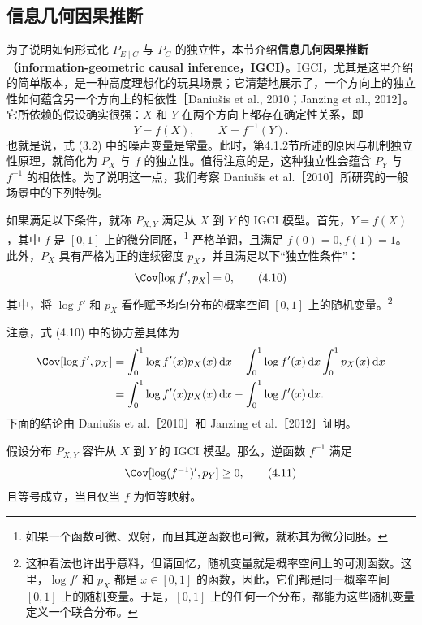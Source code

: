 \subsection{信息几何因果推断}

为了说明如何形式化 $P_{E\mid C}$ 与 $P_C$ 的独立性，本节介绍\textbf{信息几何因果推断（information-geometric causal inference，IGCI）}。IGCI，尤其是这里介绍的简单版本，是一种高度理想化的玩具场景；它清楚地展示了，一个方向上的独立性如何蕴含另一个方向上的相依性［Daniušis et al., 2010；Janzing et al., 2012］。它所依赖的假设确实很强：$X$ 和 $Y$ 在两个方向上都存在确定性关系，即
\[
 Y=f(X),\qquad X=f^{-1}(Y).
\]
也就是说，式 (3.2) 中的噪声变量是常量。此时，第4.1.2节所述的原因与机制独立性原理，就简化为 $P_X$ 与 $f$ 的独立性。值得注意的是，这种独立性会蕴含 $P_Y$ 与 $f^{-1}$ 的相依性。为了说明这一点，我们考察 Daniušis et al.［2010］所研究的一般场景中的下列特例。

\begin{definition}[信息几何因果推断模型]
如果满足以下条件，就称 $P_{X,Y}$ 满足从 $X$ 到 $Y$ 的 IGCI 模型。首先，$Y=f(X)$，其中 $f$ 是 $[0,1]$ 上的微分同胚，\footnote{如果一个函数可微、双射，而且其逆函数也可微，就称其为微分同胚。}
严格单调，且满足 $f(0)=0,f(1)=1$。此外，$P_X$ 具有严格为正的连续密度 $p_X$，并且满足以下“独立性条件”：
\begin{equation}
 \Cov[\log f',p_X]=0,
 \tag{4.10}
\end{equation}
其中，将 $\log f'$ 和 $p_X$ 看作赋予均匀分布的概率空间 $[0,1]$ 上的随机变量。\footnote{这种看法也许出乎意料，但请回忆，随机变量就是概率空间上的可测函数。这里，$\log f'$ 和 $p_X$ 都是 $x\in[0,1]$ 的函数，因此，它们都是同一概率空间 $[0,1]$ 上的随机变量。于是，$[0,1]$ 上的任何一个分布，都能为这些随机变量定义一个联合分布。}
\end{definition}

注意，式 (4.10) 中的协方差具体为
\[
\begin{aligned}
 \Cov[\log f',p_X]
 &=\int_0^1\log f'(x)p_X(x)\,\mathrm{d}x
   -\int_0^1\log f'(x)\,\mathrm{d}x
    \int_0^1p_X(x)\,\mathrm{d}x\\
 &=\int_0^1\log f'(x)p_X(x)\,\mathrm{d}x
   -\int_0^1\log f'(x)\,\mathrm{d}x.
\end{aligned}
\]
下面的结论由 Daniušis et al.［2010］和 Janzing et al.［2012］证明。

\begin{theorem}[信息几何因果推断模型的可识别性]
假设分布 $P_{X,Y}$ 容许从 $X$ 到 $Y$ 的 IGCI 模型。那么，逆函数 $f^{-1}$ 满足
\begin{equation}
 \Cov[\log (f^{-1})',p_Y]\geq0,
 \tag{4.11}
\end{equation}
且等号成立，当且仅当 $f$ 为恒等映射。
\end{theorem}

